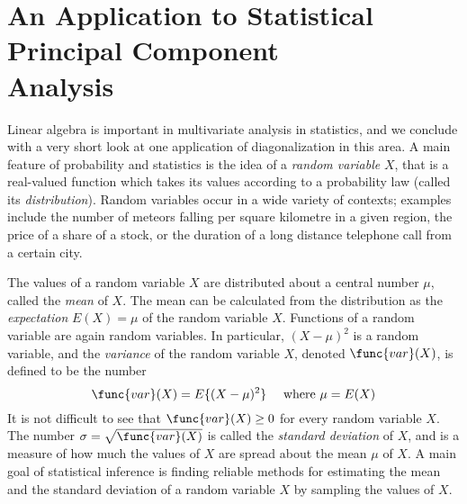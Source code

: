\section[An Application to Statistical Principal Component Analysis]{An Application to Statistical Principal Component \\ Analysis}
\label{sec:8_10}

Linear algebra is important in multivariate analysis in statistics, and we conclude with a very short look at one application of diagonalization in this area. A main feature of probability and statistics is the idea of a \textit{random variable} $X$, that is a real-valued function which takes its values according to a probability law (called its \textit{distribution}). Random variables occur in a wide variety of contexts; examples include the number of meteors falling per square kilometre in a given region, the price of a share of a stock, or the duration of a long distance telephone call from a certain city.


The values of a random variable $X$ are distributed about a central number $\mu$, called the \textit{mean} of $X$. The mean can be calculated from the distribution as the \textit{expectation} $E(X) = \mu$ of the random variable $X$. Functions of a random variable are again random variables. In particular, $(X - \mu)^{2}$ is a random variable, and the \textit{variance} of the random variable $X$, denoted $\func{var}(X)$, is defined to be the number
\begin{equation*}
\func{var}(X) = E\{(X - \mu)^2\} \quad \mbox{ where } \mu = E(X)
\end{equation*}
It is not difficult to see that $\func{var}(X) \geq 0$ for every random variable $X$. The number $\sigma = \sqrt{\func{var}(X)}$ is called the \textit{standard deviation} of $X$, and is a measure of how much the values of $X$ are spread about the mean $\mu$ of $X$. A main goal of statistical inference is finding reliable methods for estimating the mean and the standard deviation of a random variable $X$ by sampling the values of $X$.


